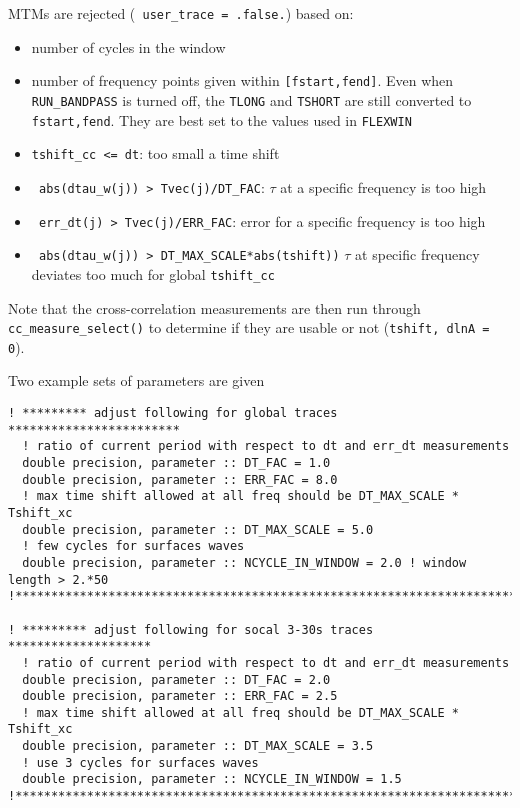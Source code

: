 \documentclass[11pt,titlepage,fleqn]{article}
\begin{document}
MTMs are rejected (\verb+ user_trace = .false.+) based on:
\begin{itemize}
\item number of cycles in the window
\item number of frequency points given within \verb+[fstart,fend]+. Even when \verb+RUN_BANDPASS+ is turned off, the \verb+TLONG+ and \verb+TSHORT+ are still converted to \verb+fstart,fend+. They are best set to the values used in \verb+FLEXWIN+
\item \verb+tshift_cc <= dt+: too small a time shift
\item \verb+ abs(dtau_w(j)) > Tvec(j)/DT_FAC+: $\tau$ at a specific frequency is too high
\item \verb+ err_dt(j) > Tvec(j)/ERR_FAC+: error for a specific frequency is too high
\item \verb+ abs(dtau_w(j)) > DT_MAX_SCALE*abs(tshift))+ $\tau$ at specific frequency deviates too much for global \verb+tshift_cc+
\end{itemize}
Note that the cross-correlation measurements are then run through \verb+cc_measure_select()+ to determine if they are
usable or not (\verb+tshift, dlnA = 0+).

Two example sets of parameters are given
%
\begin{verbatim}
! ********* adjust following for global traces ************************
  ! ratio of current period with respect to dt and err_dt measurements
  double precision, parameter :: DT_FAC = 1.0
  double precision, parameter :: ERR_FAC = 8.0
  ! max time shift allowed at all freq should be DT_MAX_SCALE * Tshift_xc
  double precision, parameter :: DT_MAX_SCALE = 5.0
  ! few cycles for surfaces waves
  double precision, parameter :: NCYCLE_IN_WINDOW = 2.0 ! window length > 2.*50
!***********************************************************************

! ********* adjust following for socal 3-30s traces ********************
  ! ratio of current period with respect to dt and err_dt measurements
  double precision, parameter :: DT_FAC = 2.0
  double precision, parameter :: ERR_FAC = 2.5
  ! max time shift allowed at all freq should be DT_MAX_SCALE * Tshift_xc
  double precision, parameter :: DT_MAX_SCALE = 3.5
  ! use 3 cycles for surfaces waves
  double precision, parameter :: NCYCLE_IN_WINDOW = 1.5
!***********************************************************************
\end{verbatim}

\end{document}
